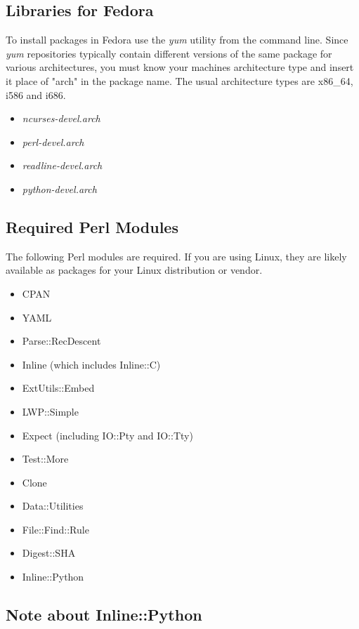 \documentclass[12pt]{article}
\begin{document}
\subsection*{Libraries for Fedora}

To install packages in Fedora use the {\it yum} utility from the command line. Since {\it yum} repositories typically contain different versions of the same package for various architectures, you must know your machines architecture type and insert it place of "arch" in the package name. The usual architecture types are x86\_64, i586 and i686.

\begin{itemize}
\item {\it ncurses-devel.arch}
\item {\it perl-devel.arch}
\item {\it readline-devel.arch}
\item {\it python-devel.arch}
\end{itemize}



\subsection*{Required Perl Modules}

The following Perl modules are required.  If you are using Linux, they
are likely available as packages for your Linux distribution or vendor.

\begin{itemize}
   \item CPAN
   \item YAML
   \item Parse::RecDescent
   \item Inline (which includes Inline::C)
   \item ExtUtils::Embed
   \item LWP::Simple
   \item Expect (including IO::Pty and IO::Tty)
   \item Test::More
   \item Clone
   \item Data::Utilities
   \item File::Find::Rule
   \item Digest::SHA
   \item Inline::Python
\end{itemize}


\subsection*{Note about Inline::Python}
\end{document}
